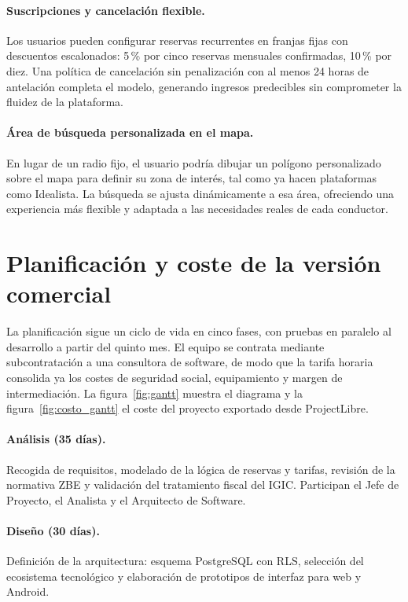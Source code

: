 \paragraph{Suscripciones y cancelación flexible.} Los usuarios pueden configurar reservas recurrentes en franjas fijas con descuentos escalonados: 5\,\% por cinco reservas mensuales confirmadas, 10\,\% por diez. Una política de cancelación sin penalización con al menos 24 horas de antelación completa el modelo, generando ingresos predecibles sin comprometer la fluidez de la plataforma.

\paragraph{Área de búsqueda personalizada en el mapa.} En lugar de un radio fijo, el usuario podría dibujar un polígono personalizado sobre el mapa para definir su zona de interés, tal como ya hacen plataformas como Idealista. La búsqueda se ajusta dinámicamente a esa área, ofreciendo una experiencia más flexible y adaptada a las necesidades reales de cada conductor.

\section{Planificación y coste de la versión comercial}
\label{sec:desarrollo_proyecto}

La planificación sigue un ciclo de vida en cinco fases, con pruebas en paralelo al desarrollo a partir del quinto mes. El equipo se contrata mediante subcontratación a una consultora de software, de modo que la tarifa horaria consolida ya los costes de seguridad social, equipamiento y margen de intermediación. La figura~\ref{fig:gantt} muestra el diagrama y la figura~\ref{fig:costo_gantt} el coste del proyecto exportado desde ProjectLibre.

\paragraph{Análisis (35 días).} Recogida de requisitos, modelado de la lógica de reservas y tarifas, revisión de la normativa ZBE y validación del tratamiento fiscal del IGIC. Participan el Jefe de Proyecto, el Analista y el Arquitecto de Software.

\paragraph{Diseño (30 días).} Definición de la arquitectura: esquema PostgreSQL con RLS, selección del ecosistema tecnológico y elaboración de prototipos de interfaz para web y Android.

